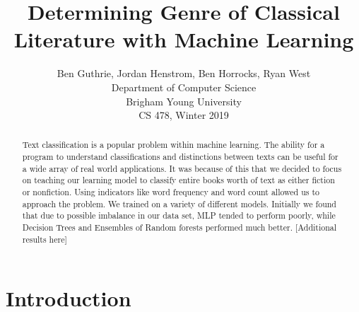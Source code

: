 \documentclass{article}
\title{Determining Genre of Classical Literature with Machine Learning}
\author{Ben Guthrie, Jordan Henstrom, Ben Horrocks, Ryan West \\
Department of Computer Science\\
Brigham Young University \\
CS 478, Winter 2019}
\begin{document}
\maketitle

\begin{abstract}
Text classification is a popular problem within machine learning. The ability for a program to understand classifications and distinctions between texts can be useful for a wide array of real world applications. It was because of this that we decided to focus on teaching our learning model to classify entire books worth of text as either fiction or nonfiction. Using indicators like word frequency and word count allowed us to approach the problem. We trained on a variety of different models. Initially we found that due to possible imbalance in our data set, MLP tended to perform poorly, while Decision Trees and Ensembles of Random forests performed much better. [Additional results here]
\end{abstract}

\section{Introduction}
\end{document}

